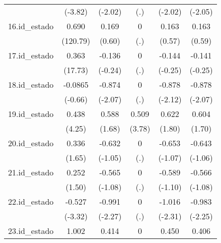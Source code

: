 {\begin{tabular}{l*{5}{c}}
            &     (-3.82)         &     (-2.02)         &         (.)         &     (-2.02)         &     (-2.05)         \\
[1em]
16.id\_estado&       0.690\sym{***}&       0.169         &           0         &       0.163         &       0.163         \\
            &    (120.79)         &      (0.60)         &         (.)         &      (0.57)         &      (0.59)         \\
[1em]
17.id\_estado&       0.363\sym{***}&      -0.136         &           0         &      -0.144         &      -0.141         \\
            &     (17.73)         &     (-0.24)         &         (.)         &     (-0.25)         &     (-0.25)         \\
[1em]
18.id\_estado&     -0.0865         &      -0.874\sym{*}  &           0         &      -0.878\sym{*}  &      -0.878\sym{*}  \\
            &     (-0.66)         &     (-2.07)         &         (.)         &     (-2.12)         &     (-2.07)         \\
[1em]
19.id\_estado&       0.438\sym{***}&       0.588         &       0.509\sym{***}&       0.622         &       0.604         \\
            &      (4.25)         &      (1.68)         &      (3.78)         &      (1.80)         &      (1.70)         \\
[1em]
20.id\_estado&       0.336         &      -0.632         &           0         &      -0.653         &      -0.643         \\
            &      (1.65)         &     (-1.05)         &         (.)         &     (-1.07)         &     (-1.06)         \\
[1em]
21.id\_estado&       0.252         &      -0.565         &           0         &      -0.589         &      -0.566         \\
            &      (1.50)         &     (-1.08)         &         (.)         &     (-1.10)         &     (-1.08)         \\
[1em]
22.id\_estado&      -0.527\sym{***}&      -0.991\sym{*}  &           0         &      -1.016\sym{*}  &      -0.983\sym{*}  \\
            &     (-3.32)         &     (-2.27)         &         (.)         &     (-2.31)         &     (-2.25)         \\
[1em]
23.id\_estado&       1.002\sym{***}&       0.414         &           0         &       0.450         &       0.406         \\

\end{tabular}}
